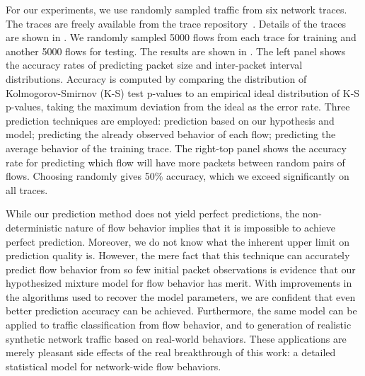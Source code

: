 \documentclass{acm_proc_article-sp}
\begin{document}
For our experiments, we use randomly sampled traffic from six network traces.
The traces are freely available from the  trace repository~\cite{Yeo06}.
Details of the traces are shown in .
We randomly sampled 5000 flows from each trace for training and another 5000 flows for testing.
The results are shown in .
The left panel shows the accuracy rates of predicting packet size and inter-packet interval distributions.
Accuracy is computed by comparing the distribution of Kolmogorov-Smirnov (K-S) test p-values to an empirical ideal distribution of K-S p-values, taking the maximum deviation from the ideal as the error rate.
Three prediction techniques are employed:
prediction based on our hypothesis and model;
predicting the already observed behavior of each flow;
predicting the average behavior of the training trace.
The right-top panel shows the accuracy rate for predicting which flow will have more packets between random pairs of flows.
Choosing randomly gives 50\% accuracy, which we exceed significantly on all traces.

While our prediction method does not yield perfect predictions, the non-deterministic nature of flow behavior implies that it is impossible to achieve perfect prediction.
Moreover, we do not know what the inherent upper limit on prediction quality is.
However, the mere fact that this technique can accurately predict flow behavior from so few initial packet observations is evidence that our hypothesized mixture model for flow behavior has merit.
With improvements in the algorithms used to recover the model parameters, we are confident that even better prediction accuracy can be achieved.
Furthermore, the same model can be applied to traffic classification from flow behavior, and to generation of realistic synthetic network traffic based on real-world behaviors.
These applications are merely pleasant side effects of the real breakthrough of this work:
a detailed statistical model for network-wide flow behaviors.

\renewcommand{\thesection}{\textsection}
\vspace{-0.15em}
\scriptsize


\end{document}
